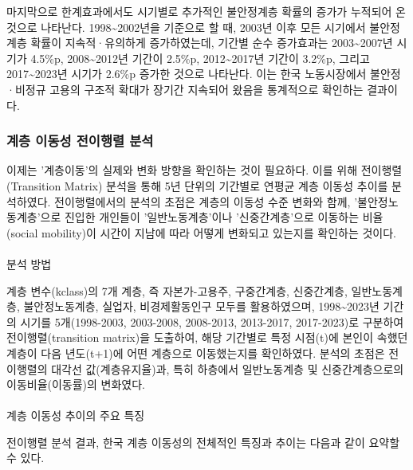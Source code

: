 \documentclass[
  letterpaper,
  DIV=11,
  numbers=noendperiod]{scrartcl}
\makeatletter
\let\oldparagraph\paragraph
\renewcommand{\paragraph}{
    \@ifstar
      \xxxParagraphStar
      \xxxParagraphNoStar
  }
\newcommand{\xxxParagraphStar}[1]{\oldparagraph*{#1}\mbox{}}
\newcommand{\xxxParagraphNoStar}[1]{\oldparagraph{#1}\mbox{}}
\makeatother
\begin{document}
마지막으로 한계효과에서도 시기별로 추가적인 불안정계층 확률의 증가가
누적되어 온 것으로 나타난다. 1998\textasciitilde2002년을 기준으로 할 때,
2003년 이후 모든 시기에서 불안정계층 확률이 지속적·유의하게
증가하였는데, 기간별 순수 증가효과는 2003\textasciitilde2007년 시기가
4.5\%p, 2008\textasciitilde2012년 기간이 2.5\%p,
2012\textasciitilde2017년 기간이 3.2\%p, 그리고
2017\textasciitilde2023년 시기가 2.6\%p 증가한 것으로 나타난다. 이는
한국 노동시장에서 불안정·비정규 고용의 구조적 확대가 장기간 지속되어
왔음을 통계적으로 확인하는 결과이다.

\newpage{}

\subsubsection{계층 이동성 전이행렬
분석}\label{uxacc4uxce35-uxc774uxb3d9uxc131-uxc804uxc774uxd589uxb82c-uxbd84uxc11d}

이제는 '계층이동'의 실제와 변화 방향을 확인하는 것이 필요하다. 이를 위해
전이행렬(Transition Matrix) 분석을 통해 5년 단위의 기간별로 연평균 계층
이동성 추이를 분석하였다. 전이행렬에서의 분석의 초점은 계층의 이동성
수준 변화와 함께, '불안정노동계층'으로 진입한 개인들이
'일반노동계층'이나 '신중간계층'으로 이동하는 비율(social mobility)이
시간이 지남에 따라 어떻게 변화되고 있는지를 확인하는 것이다.

\paragraph{분석 방법}\label{uxbd84uxc11d-uxbc29uxbc95}

계층 변수(kclass)의 7개 계층, 즉 자본가-고용주, 구중간계층, 신중간계층,
일반노동계층, 불안정노동계층, 실업자, 비경제활동인구 모두를
활용하였으며, 1998\textasciitilde2023년 기간의 시기를 5개(1998-2003,
2003-2008, 2008-2013, 2013-2017, 2017-2023)로 구분하여
전이행렬(transition matrix)을 도출하여, 해당 기간별로 특정 시점(t)에
본인이 속했던 계층이 다음 년도(t+1)에 어떤 계층으로 이동했는지를
확인하였다. 분석의 초점은 전이행렬의 대각선 값(계층유지율)과, 특히
하층에서 일반노동계층 및 신중간계층으로의 이동비율(이동률)의 변화였다.

\paragraph{계층 이동성 추이의 주요
특징}\label{uxacc4uxce35-uxc774uxb3d9uxc131-uxcd94uxc774uxc758-uxc8fcuxc694-uxd2b9uxc9d5}

전이행렬 분석 결과, 한국 계층 이동성의 전체적인 특징과 추이는 다음과
같이 요약할 수 있다.
\end{document}
